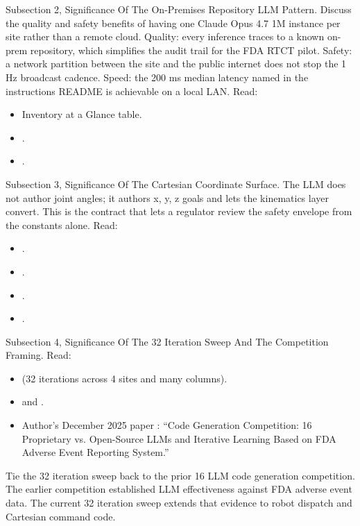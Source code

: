 \begin{sectionaccent}
Subsection 2, Significance Of The On-Premises Repository LLM Pattern.
Discuss the quality and safety benefits of having one Claude Opus 4.7
1M instance per site rather than a remote cloud. Quality: every
inference traces to a known on-prem repository, which simplifies the
audit trail for the FDA RTCT pilot. Safety: a network partition
between the site and the public internet does not stop the 1 Hz
broadcast cadence. Speed: the 200 ms median latency named in the
instructions README is achievable on a local LAN. Read:
\begin{itemize}
  \item {}
        Inventory at a Glance table.
  \item {}.
  \item {}.
\end{itemize}

Subsection 3, Significance Of The Cartesian Coordinate Surface. The
LLM does not author joint angles; it authors x, y, z goals and lets
the kinematics layer convert. This is the contract that lets a
regulator review the safety envelope from the constants alone. Read:
\begin{itemize}
  \item {}.
  \item {}.
  \item {}.
  \item {}.
\end{itemize}

Subsection 4, Significance Of The 32 Iteration Sweep And The
Competition Framing. Read:
\begin{itemize}
  \item {}
        (32 iterations across 4 sites and many columns).
  \item {}
        and .
  \item Author's December 2025 paper
        : ``Code Generation
        Competition: 16 Proprietary vs. Open-Source LLMs and Iterative
        Learning Based on FDA Adverse Event Reporting System.''
\end{itemize}
Tie the 32 iteration sweep back to the prior 16 LLM code generation
competition. The earlier competition established LLM effectiveness
against FDA adverse event data. The current 32 iteration sweep
extends that evidence to robot dispatch and Cartesian command code.


\end{sectionaccent}
